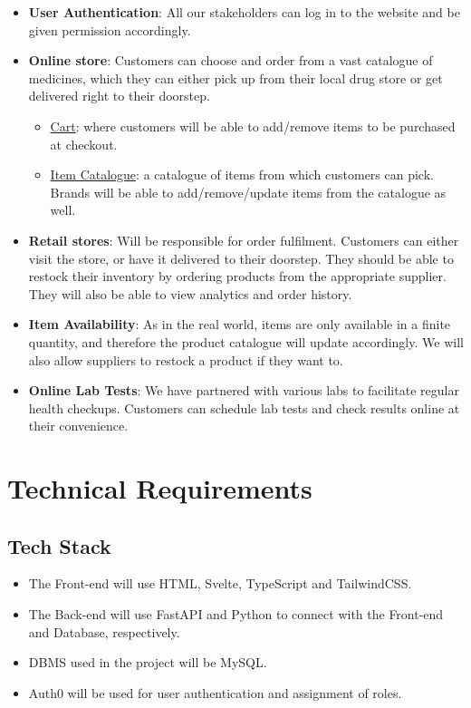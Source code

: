 \documentclass{article}
\begin{document}
\begin{itemize}
\item \textbf{User Authentication}: All our stakeholders can log in to the website and be given permission accordingly. 
\item \textbf{Online store}: Customers can choose and order from a vast catalogue of medicines, which they can either pick up from their local drug store or get delivered right to their doorstep.
    \begin{itemize}
        \item \underline{Cart}: where customers will be able to add/remove items to be purchased at checkout.
        \item \underline{Item Catalogue}: a catalogue of items from which customers can pick. Brands will be able to add/remove/update items from the catalogue as well.
    \end{itemize}
\item \textbf{Retail stores}: Will be responsible for order fulfilment. Customers can either visit the store, or have it delivered to their doorstep. They should be able to restock their inventory by ordering products from the appropriate supplier. They will also be able to view analytics and order history.
\item \textbf{Item Availability}: As in the real world, items are only available in a finite quantity, and therefore the product catalogue will update accordingly. We will also allow suppliers to restock a product if they want to. 
\item \textbf{Online Lab Tests}: We have partnered with various labs to facilitate regular health checkups. Customers can schedule lab tests and check results online at their convenience.
\end{itemize}

\section{Technical Requirements}
\subsection{Tech Stack}
\begin{itemize}
\item The Front-end will use HTML, Svelte, TypeScript and TailwindCSS. 
\item The Back-end will use FastAPI and Python to connect with the Front-end and Database, respectively.
\item DBMS used in the project will be MySQL.
\item Auth0 will be used for user authentication and assignment of roles.
\end{itemize}
\end{document}
